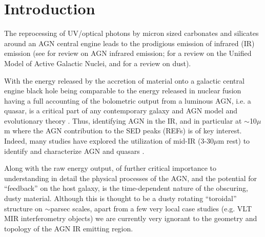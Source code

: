 \documentclass{emulateapj}
\begin{document}

\maketitle


\section{Introduction}
The reprocessing of UV/optical photons by micron sized carbonates and
silicates around an AGN central engine leads to the prodigious emission
of infrared (IR) emission (see \citet{Elitzur14} for review on AGN infrared
emission; \citet{Netzer15} for a review on the Unified Model of
Active Galactic Nuclei, and \citet[][]{Draine03} for a
review on dust).

With the energy released by the accretion of material onto a galactic
central engine black hole being comparable to the energy released in
nuclear fusion having a full accounting of the bolometric output from
a luminous AGN, i.e. a quasar, is a critical part of any contemporary
galaxy and AGN model and evolutionary theory
\citep[e.g.,][]{Rosas-Guevara2016, Bower2017, McAlpine2017,
Pillepich2017}. Thus, identifying AGN in the IR, and in particular at
$\sim$10$\mu$m where the AGN contribution to the SED peaks (REFs) is
of key interest. Indeed, many studies have explored the utilization of
mid-IR (3-30$\mu$m rest) to identify and characterize AGN and quasars
\citep{Lacy04, Stern05, Martinez-Sansigre06, Richards09b, Donley12,
Stern12, Banerji13, Assef13, Richards15, Timlin16}.

Along with the raw energy output, of further critical importance to
understanding in detail the physical processes of the AGN, and the
potential for ``feedback'' on the host galaxy, is the time-dependent
nature of the obscuring, dusty material. Although this is thought to
be a dusty rotating ``toroidal'' structure on $\sim$parsec scales,
apart from a few very local case studies (e.g. VLT MIR interferometry
objects) we are currently very ignorant to the geometry and topology
of the AGN IR emitting region.
\end{document}
